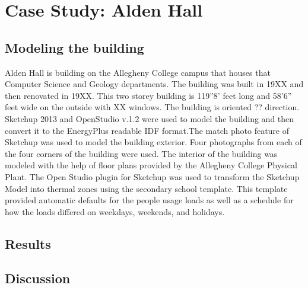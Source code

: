 \chapter{Case Study: Alden Hall}
\section{Modeling the building}
	Alden Hall is building on the Allegheny College campus that houses that Computer Science and Geology departments. The building was built in 19XX and then renovated in 19XX. This two storey building is 119''8' feet long and 58'6'' feet wide on the outside with XX windows. The building is oriented ?? direction.
	Sketchup 2013 and OpenStudio v.1.2 were used to model the building and then convert it to the EnergyPlus readable IDF format.The match photo feature of Sketchup was used to model the building exterior. Four photographs from each of the four corners of the building were used. The interior of the building was modeled with the help of floor plans provided by the Allegheny College Physical Plant. The Open Studio plugin for Sketchup was used to transform the Sketchup Model into thermal zones using the secondary school template. This template provided automatic defaults for the people usage loads as well as a schedule for how the loads differed on weekdays, weekends, and holidays.
\section{Results}
\section{Discussion}